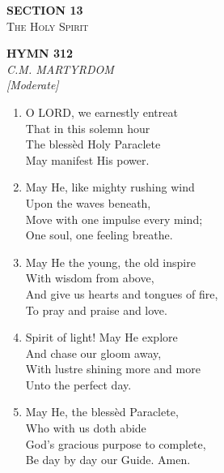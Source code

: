 \documentclass[11pt,a4paper]{article}
\begin{document}
\newpage
\thispagestyle{empty}
\vspace*{3.5cm}
\begin{center}
    {\LARGE \textbf{SECTION 13}}\\[0.8em]
    {\Large \textsc{The Holy Spirit}}
\end{center}
\vspace{3.5cm}

\newpage
\begin{center}
    {\Large \textbf{HYMN 312}}
    \\
    \textit{C.M. MARTYRDOM}
    \\
    \textit{\small [Moderate]}
\end{center}
\vspace{1em}

\begin{enumerate}
    \item O LORD, we earnestly entreat \\
        That in this solemn hour \\
        The bless\`ed Holy Paraclete \\
        May manifest His power.

    \item May He, like mighty rushing wind \\
        Upon the waves beneath, \\
        Move with one impulse every mind; \\
        One soul, one feeling breathe.

    \item May He the young, the old inspire \\
        With wisdom from above, \\
        And give us hearts and tongues of fire, \\
        To pray and praise and love.

    \item Spirit of light! May He explore \\
        And chase our gloom away, \\
        With lustre shining more and more \\
        Unto the perfect day.

    \item May He, the bless\`ed Paraclete, \\
        Who with us doth abide \\
        God's gracious purpose to complete, \\
        Be day by day our Guide. Amen.

\end{enumerate}
\end{document}
